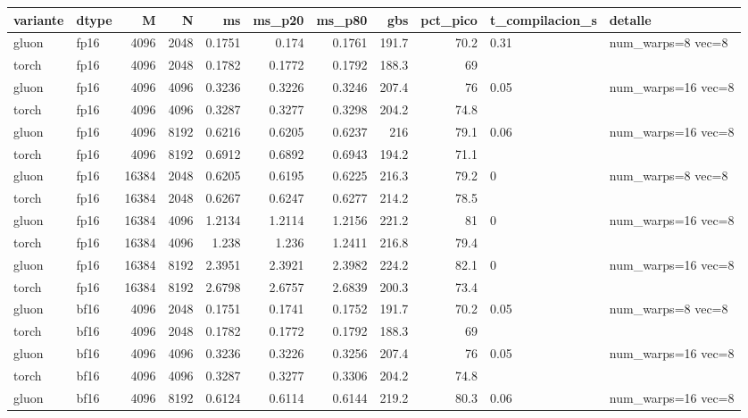 \begin{table}[htbp]
  \centering\small
  \begin{tabular}{llrrrrrrrll}
    \toprule
    variante & dtype & M & N & ms & ms\_p20 & ms\_p80 & gbs & pct\_pico & t\_compilacion\_s & detalle \\
    \midrule
    gluon & fp16 & 4096 & 2048 & 0.1751 & 0.174 & 0.1761 & 191.7 & 70.2 & 0.31 & num\_warps=8 vec=8 \\
    torch & fp16 & 4096 & 2048 & 0.1782 & 0.1772 & 0.1792 & 188.3 & 69 &  &  \\
    gluon & fp16 & 4096 & 4096 & 0.3236 & 0.3226 & 0.3246 & 207.4 & 76 & 0.05 & num\_warps=16 vec=8 \\
    torch & fp16 & 4096 & 4096 & 0.3287 & 0.3277 & 0.3298 & 204.2 & 74.8 &  &  \\
    gluon & fp16 & 4096 & 8192 & 0.6216 & 0.6205 & 0.6237 & 216 & 79.1 & 0.06 & num\_warps=16 vec=8 \\
    torch & fp16 & 4096 & 8192 & 0.6912 & 0.6892 & 0.6943 & 194.2 & 71.1 &  &  \\
    gluon & fp16 & 16384 & 2048 & 0.6205 & 0.6195 & 0.6225 & 216.3 & 79.2 & 0 & num\_warps=8 vec=8 \\
    torch & fp16 & 16384 & 2048 & 0.6267 & 0.6247 & 0.6277 & 214.2 & 78.5 &  &  \\
    gluon & fp16 & 16384 & 4096 & 1.2134 & 1.2114 & 1.2156 & 221.2 & 81 & 0 & num\_warps=16 vec=8 \\
    torch & fp16 & 16384 & 4096 & 1.238 & 1.236 & 1.2411 & 216.8 & 79.4 &  &  \\
    gluon & fp16 & 16384 & 8192 & 2.3951 & 2.3921 & 2.3982 & 224.2 & 82.1 & 0 & num\_warps=16 vec=8 \\
    torch & fp16 & 16384 & 8192 & 2.6798 & 2.6757 & 2.6839 & 200.3 & 73.4 &  &  \\
    gluon & bf16 & 4096 & 2048 & 0.1751 & 0.1741 & 0.1752 & 191.7 & 70.2 & 0.05 & num\_warps=8 vec=8 \\
    torch & bf16 & 4096 & 2048 & 0.1782 & 0.1772 & 0.1792 & 188.3 & 69 &  &  \\
    gluon & bf16 & 4096 & 4096 & 0.3236 & 0.3226 & 0.3256 & 207.4 & 76 & 0.05 & num\_warps=16 vec=8 \\
    torch & bf16 & 4096 & 4096 & 0.3287 & 0.3277 & 0.3306 & 204.2 & 74.8 &  &  \\
    gluon & bf16 & 4096 & 8192 & 0.6124 & 0.6114 & 0.6144 & 219.2 & 80.3 & 0.06 & num\_warps=16 vec=8 \\

\end{tabular}
\end{table}
